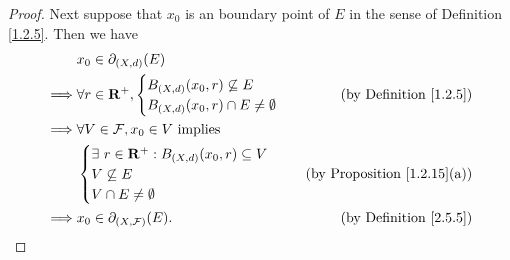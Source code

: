 \begin{proof}
    Next suppose that \(x_0\) is an boundary point of \(E\) in the sense of Definition \ref{1.2.5}.
    Then we have
    \begin{align*}
                 & x_0 \in \partial_{(X, d)}(E)                                                                         \\
        \implies & \forall r \in \mathbf{R}^+, \begin{cases}
                                                   B_{(X, d)}(x_0, r) \not\subseteq E \\
                                                   B_{(X, d)}(x_0, r) \cap E \neq \emptyset
                                               \end{cases}                       & \text{(by Definition \ref{1.2.5})}   \\
        \implies & \forall V \in \mathcal{F}, x_0 \in V \text{ implies}                                                 \\
                 & \begin{cases}
                       \exists\ r \in \mathbf{R}^+ : B_{(X, d)}(x_0, r) \subseteq V \\
                       V \not\subseteq E                                            \\
                       V \cap E \neq \emptyset
                   \end{cases} & \text{(by Proposition \ref{1.2.15}(a))}                                         \\
        \implies & x_0 \in \partial_{(X, \mathcal{F})}(E).                         & \text{(by Definition \ref{2.5.5})}
    \end{align*}


\end{proof}
